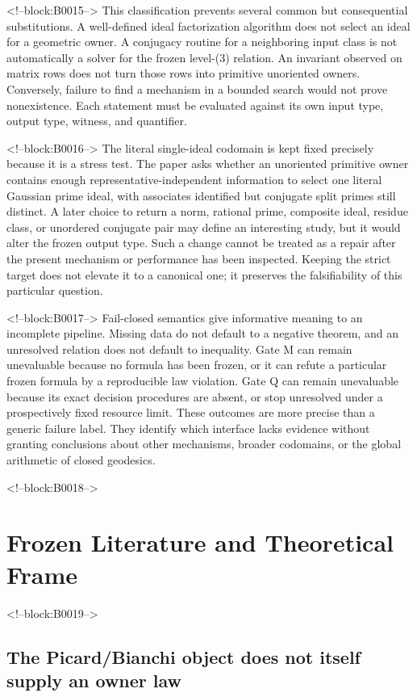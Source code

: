 \documentclass[11pt,a4paper]{article}
\begin{document}
<!--block:B0015-->
This classification prevents several common but consequential substitutions. A well-defined ideal factorization algorithm does not select an ideal for a geometric owner. A conjugacy routine for a neighboring input class is not automatically a solver for the frozen level-(3) relation. An invariant observed on matrix rows does not turn those rows into primitive unoriented owners. Conversely, failure to find a mechanism in a bounded search would not prove nonexistence. Each statement must be evaluated against its own input type, output type, witness, and quantifier.

<!--block:B0016-->
The literal single-ideal codomain is kept fixed precisely because it is a stress test. The paper asks whether an unoriented primitive owner contains enough representative-independent information to select one literal Gaussian prime ideal, with associates identified but conjugate split primes still distinct. A later choice to return a norm, rational prime, composite ideal, residue class, or unordered conjugate pair may define an interesting study, but it would alter the frozen output type. Such a change cannot be treated as a repair after the present mechanism or performance has been inspected. Keeping the strict target does not elevate it to a canonical one; it preserves the falsifiability of this particular question.

<!--block:B0017-->
Fail-closed semantics give informative meaning to an incomplete pipeline. Missing data do not default to a negative theorem, and an unresolved relation does not default to inequality. Gate M can remain unevaluable because no formula has been frozen, or it can refute a particular frozen formula by a reproducible law violation. Gate Q can remain unevaluable because its exact decision procedures are absent, or stop unresolved under a prospectively fixed resource limit. These outcomes are more precise than a generic failure label. They identify which interface lacks evidence without granting conclusions about other mechanisms, broader codomains, or the global arithmetic of closed geodesics.

<!--block:B0018-->
\section{Frozen Literature and Theoretical Frame}

<!--block:B0019-->
\subsection{The Picard/Bianchi object does not itself supply an owner law}
\end{document}
